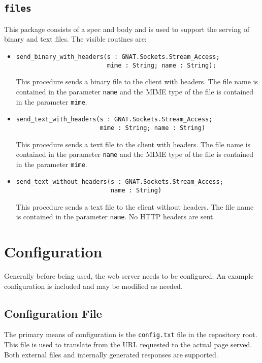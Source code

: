 \documentclass[10pt, openany]{book}
\begin{document}
\subsection{\texttt{files}}
This package consists of a spec and body and is used to support the serving of binary and text files.  The visible routines are:
\begin{itemize}
  \item \begin{lstlisting}send_binary_with_headers(s : GNAT.Sockets.Stream_Access;
                         mime : String; name : String);
            \end{lstlisting}
  This procedure sends a binary file to the client with headers.  The file name is contained in the parameter \texttt{name} and the MIME type of the file is contained in the parameter \texttt{mime}.

  \item \begin{lstlisting}send_text_with_headers(s : GNAT.Sockets.Stream_Access;
                       mime : String; name : String)
  \end{lstlisting}
  This procedure sends a text file to the client with headers.  The file name is contained in the parameter \texttt{name} and the MIME type of the file is contained in the parameter \texttt{mime}.

  \item \begin{lstlisting}send_text_without_headers(s : GNAT.Sockets.Stream_Access;
                          name : String)
  \end{lstlisting}
  This procedure sends a text file to the client without headers.  The file name is contained in the parameter \texttt{name}.  No HTTP headers are sent.
\end{itemize}

\section{Configuration}
Generally before being used, the web server needs to be configured.  An example configuration is included and may be modified as needed.

\subsection{Configuration File}
The primary means of configuration is the \texttt{config.txt} file in the repository root.  This file is used to translate from the URL requested to the actual page served.  Both external files and internally generated responses are supported.
\end{document}
